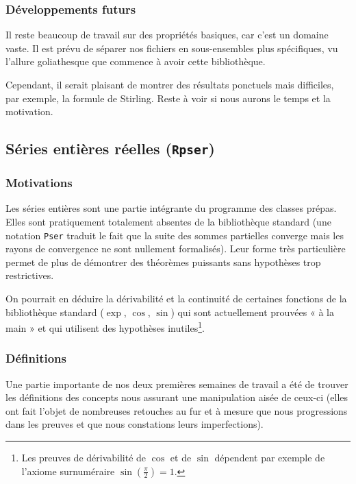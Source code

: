\documentclass[a4paper,10pt]{article}
\newcommand{\coqcode}[1]{\texttt{#1}}
\begin{document}
\subsubsection{Développements futurs}

Il reste beaucoup de travail sur des propriétés basiques, car c'est un domaine vaste. Il est prévu de séparer nos fichiers en sous-ensembles plus spécifiques, vu l'allure goliathesque que commence à avoir cette bibliothèque.

Cependant, il serait plaisant de montrer des résultats ponctuels mais difficiles, par exemple, la formule de Stirling. Reste à voir si nous aurons le temps et la motivation.

\subsection{Séries entières réelles (\coqcode{Rpser})}

\subsubsection{Motivations}

Les séries entières sont une partie intégrante du programme des classes prépas. Elles sont pratiquement totalement absentes de la bibliothèque standard (une notation \coqcode{Pser} traduit le fait que la suite des sommes partielles converge mais les rayons de convergence ne sont nullement formalisés). Leur forme très particulière permet de plus de démontrer des théorèmes puissants sans hypothèses trop restrictives.

On pourrait en déduire la dérivabilité et la continuité de certaines fonctions de la bibliothèque standard ($\exp$, $\cos$, $\sin$) qui sont actuellement prouvées « à la main » et qui utilisent des hypothèses inutiles\footnote{Les preuves de dérivabilité de $\cos$ et de $\sin$ dépendent par exemple de l'axiome surnuméraire $\sin\left(\frac{\pi}{2}\right) = 1$.}.

\subsubsection{Définitions}

Une partie importante de nos deux premières semaines de travail a été de trouver les définitions des concepts nous assurant une manipulation aisée de ceux-ci (elles ont fait l'objet de nombreuses retouches au fur et à mesure que nous progressions dans les preuves et que nous constations leurs imperfections).
\end{document}

